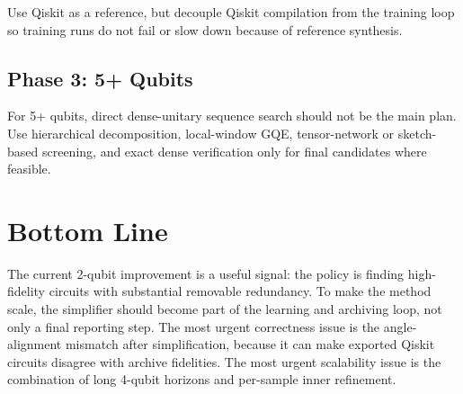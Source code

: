 \documentclass[11pt]{article}
\begin{document}
Use Qiskit as a reference, but decouple Qiskit compilation from the training loop
so training runs do not fail or slow down because of reference synthesis.

\subsection{Phase 3: 5+ Qubits}

For 5+ qubits, direct dense-unitary sequence search should not be the main plan.
Use hierarchical decomposition, local-window GQE, tensor-network or sketch-based
screening, and exact dense verification only for final candidates where feasible.

\section{Bottom Line}

The current 2-qubit improvement is a useful signal: the policy is finding
high-fidelity circuits with substantial removable redundancy.  To make the
method scale, the simplifier should become part of the learning and archiving
loop, not only a final reporting step.  The most urgent correctness issue is the
angle-alignment mismatch after simplification, because it can make exported
Qiskit circuits disagree with archive fidelities.  The most urgent scalability
issue is the combination of long 4-qubit horizons and per-sample inner
refinement.
\end{document}
